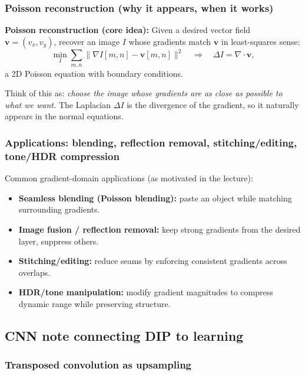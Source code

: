 \documentclass[11pt,a4paper]{article}
\newcommand{\vct}[1]{\bm{#1}}
\begin{document}
\subsubsection{Poisson reconstruction (why it appears, when it works)}

\begin{mathrule}
\textbf{Poisson reconstruction (core idea):}\;
Given a desired vector field $\vct{v}=(v_x,v_y)$, recover an image $I$ whose gradients match $\vct{v}$
in least-squares sense:
\[
\min_I \sum_{m,n} \|\nabla I[m,n] - \vct{v}[m,n]\|^2
\quad\Longrightarrow\quad
\Delta I = \nabla\cdot \vct{v},
\]
a 2D Poisson equation with boundary conditions.
\end{mathrule}

\begin{intbox}
Think of this as: \emph{choose the image whose gradients are as close as possible to what we want.}
The Laplacian $\Delta I$ is the divergence of the gradient, so it naturally appears in the normal equations.
\end{intbox}


\subsubsection{Applications: blending, reflection removal, stitching/editing, tone/HDR compression}

Common gradient-domain applications (as motivated in the lecture):
\begin{itemize}
  \item \textbf{Seamless blending (Poisson blending):} paste an object while matching surrounding gradients.
  \item \textbf{Image fusion / reflection removal:} keep strong gradients from the desired layer, suppress others.
  \item \textbf{Stitching/editing:} reduce seams by enforcing consistent gradients across overlaps.
  \item \textbf{HDR/tone manipulation:} modify gradient magnitudes to compress dynamic range while preserving structure.
\end{itemize}


\subsection{CNN note connecting DIP to learning}
\subsubsection{Transposed convolution as upsampling}
\end{document}
